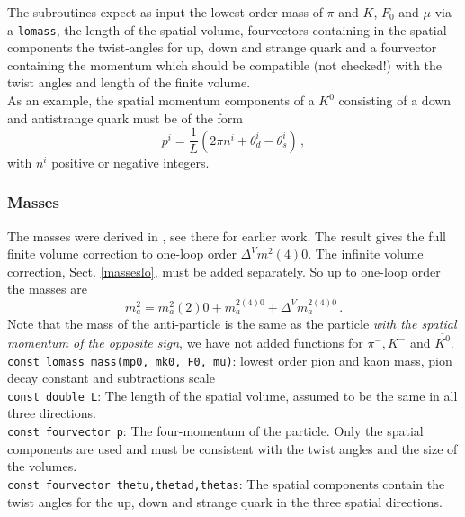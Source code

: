 \documentclass[12pt,a4paper]{article}
\newcommand{\mytt}[1]{\texttt{#1}}
\begin{document}
The subroutines expect as input the lowest order mass of $\pi$ and
$K$, $F_0$ and $\mu$ via a \mytt{lomass},
the length of the spatial volume,
fourvectors containing in the spatial components the twist-angles 
for up, down and strange quark and a fourvector containing the momentum
which should be compatible (not checked!) with the twist angles and
length of the finite volume.\\
As an example, the spatial momentum components of a $K^0$ consisting
of a down and antistrange quark must be of the form
\begin{equation}
p^i = \frac{1}{L}\left( 2\pi n^i +\theta_d^i-\theta_s^i\right)\,,
\end{equation}
with $n^i$ positive or negative integers.

\subsubsection{Masses}

The masses were derived in \cite{Bijnens:2014yya}, see there for earlier work.
The result gives the full
finite volume correction to one-loop order $\Delta^Vm^2(4)0$. 
The infinite volume correction, Sect. \ref{masseslo}, must be added
separately. So up to one-loop order the masses are
\begin{equation}
\label{defmassesTV}
m_a^2 = m_a^2(2)0+m_a^{2(4)0}+\Delta^V\! m_a^{2(4)0}\,.
\end{equation}
Note that the mass of the anti-particle is the same as the particle
\emph{with the spatial momentum of the
opposite sign}, we have not added functions for $\pi^-,K^-$ and
$\overline{K^0}$.\\

\mytt{const lomass mass(mp0, mk0, F0, mu)}: lowest order pion and kaon mass,
pion decay constant and subtractions scale\\
\mytt{const double L}: The length of the spatial volume, assumed to be the same
in all three directions.\\
\mytt{const fourvector p}: The four-momentum of the particle. Only the spatial
components are used and must be consistent with the twist angles and the size
of the volumes.\\
\mytt{const fourvector thetu,thetad,thetas}: The spatial components contain
the twist angles for the up, down and strange quark in the three spatial
directions.\\
\end{document}
